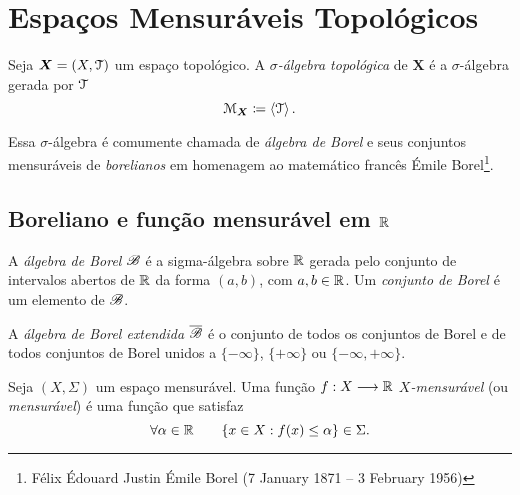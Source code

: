 \clearpage
\section{Espaços Mensuráveis Topológicos}

\begin{defi}
Seja $\bm X=(X,\mathcal{T})$ um espaço topológico. A \emph{$\sigma$-álgebra topológica} de $\bm X$ é a $\sigma$-álgebra gerada por $\mathcal{T}$
	\begin{equation*}
	\mathcal{M}_{\bm X} \coloneqq \left\langle \mathcal{T} \right\rangle.
	\end{equation*}
\end{defi}

Essa $\sigma$-álgebra é comumente chamada de \emph{álgebra de Borel} e seus conjuntos mensuráveis de \emph{borelianos} em homenagem ao matemático francês Émile Borel\footnote{Félix Édouard Justin Émile Borel (7 January 1871 – 3 February 1956)}.


\subsection{Boreliano e função mensurável em $\mathbb{R}$}

\begin{defi}
	A \emph{álgebra de Borel} $\mathscr{B}$ é a sigma-álgebra sobre $\mathbb{R}$ gerada pelo conjunto de intervalos abertos de $\mathbb{R}$ da forma $(a,b)$, com $a,b \in \mathbb{R}$. Um \emph{conjunto de Borel} é um elemento de $\mathscr{B}$.
\end{defi}

\begin{defi}
	A \emph{álgebra de Borel extendida} $\overline{\mathscr{B}}$ é o conjunto de todos os conjuntos de Borel e de todos conjuntos de Borel unidos a $\{-\infty\}$, $\{+\infty\}$ ou $\{-\infty,+\infty\}$.
\end{defi}

\begin{defi}
	Seja $(X,\Sigma)$ um espaço mensurável. Uma função $f: X \longrightarrow \mathbb{R}$ \emph{$X$-mensurável} (ou \emph{mensurável}) é uma função que satisfaz
	\begin{equation*}
	\forall \alpha \in \mathbb{R} \qquad \{x \in X : f(x) \leq \alpha\} \in \Sigma.
	\end{equation*}
\end{defi}

